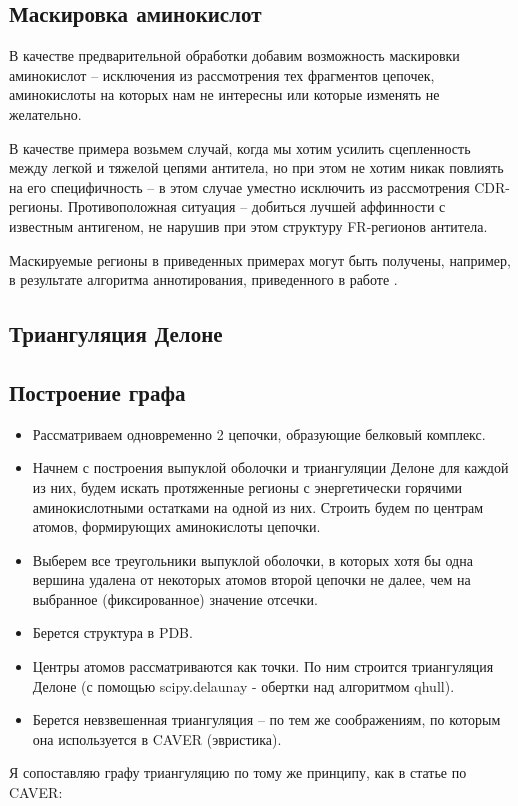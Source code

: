 \subsection{Маскировка аминокислот}
В качестве предварительной обработки добавим возможность маскировки аминокислот -- исключения из рассмотрения тех фрагментов цепочек, аминокислоты на которых нам не интересны или которые изменять не желательно. 

В качестве примера возьмем случай, когда мы хотим усилить сцепленность между легкой и тяжелой цепями антитела, но при этом не хотим никак повлиять на его специфичность -- в этом случае уместно исключить из рассмотрения CDR-регионы. Противоположная ситуация -- добиться лучшей аффинности с известным антигеном, не нарушив при этом структуру FR-регионов антитела.

Маскируемые регионы в приведенных примерах могут быть получены, например, в результате алгоритма аннотирования, приведенного в работе \cite{yakovlev2014}.

\subsection{Триангуляция Делоне}
\subsection{Построение графа}
\begin{itemize}
\item Рассматриваем одновременно 2 цепочки, образующие белковый комплекс.
\item Начнем с построения выпуклой оболочки и триангуляции Делоне для каждой из них, будем искать протяженные регионы с энергетически горячими аминокислотными остатками  на одной из них. Строить будем по центрам атомов, формирующих аминокислоты цепочки.
\item Выберем все треугольники выпуклой оболочки, в которых хотя бы одна вершина удалена от некоторых атомов второй цепочки не далее, чем на выбранное (фиксированное) значение отсечки.
\end{itemize}


\begin{itemize}
\item Берется структура в PDB.
\item Центры атомов рассматриваются как точки. По ним строится триангуляция Делоне (с помощью scipy.delaunay - обертки над алгоритмом qhull).
\item Берется невзвешенная триангуляция -- по тем же соображениям, по которым она используется в CAVER (эвристика)\cite{caver2007}.
\end{itemize}
Я сопоставляю графу триангуляцию по тому же принципу, как в статье по CAVER:

